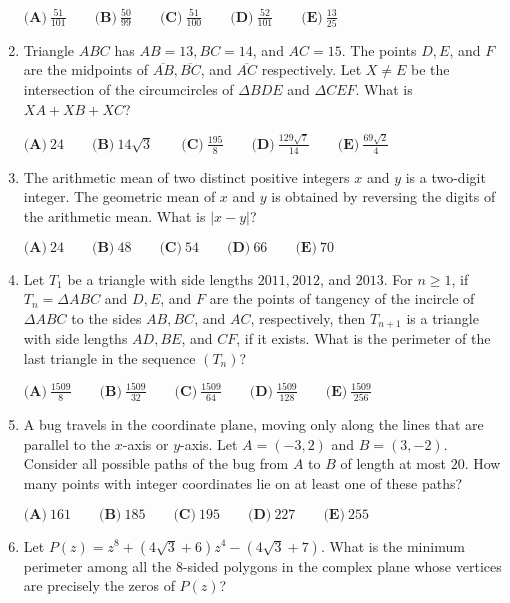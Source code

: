 \documentclass{article}
\begin{document}
\begin{enumerate}[label=\arabic*., itemsep=0.5em]
$\textbf{(A)}\ \frac{51}{101} \qquad \textbf{(B)}\ \frac{50}{99} \qquad \textbf{(C)}\ \frac{51}{100} \qquad \textbf{(D)}\ \frac{52}{101} \qquad \textbf{(E)}\ \frac{13}{25}$\par \vspace{0.5em}\item Triangle $ABC$ has $AB = 13, BC = 14$, and $AC = 15$. The points $D, E$, and $F$ are the midpoints of $\overline{AB}, \overline{BC}$, and $\overline{AC}$ respectively. Let $X \not= E$ be the intersection of the circumcircles of $\Delta BDE$ and $\Delta CEF$. What is $XA + XB + XC$?

$\textbf{(A)}\ 24 \qquad \textbf{(B)}\ 14\sqrt{3} \qquad \textbf{(C)}\ \frac{195}{8} \qquad \textbf{(D)}\ \frac{129\sqrt{7}}{14} \qquad \textbf{(E)}\ \frac{69\sqrt{2}}{4}$\par \vspace{0.5em}\item The arithmetic mean of two distinct positive integers $x$ and $y$ is a two-digit integer. The geometric mean of $x$ and $y$ is obtained by reversing the digits of the arithmetic mean. What is $|x - y|$?

$\textbf{(A)}\ 24 \qquad \textbf{(B)}\ 48 \qquad \textbf{(C)}\ 54 \qquad \textbf{(D)}\ 66 \qquad \textbf{(E)}\ 70$\par \vspace{0.5em}\item Let $T_1$ be a triangle with side lengths $2011, 2012$, and $2013$. For $n \geq 1$, if $T_n = \Delta ABC$ and $D, E$, and $F$ are the points of tangency of the incircle of $\Delta ABC$ to the sides $AB, BC$, and $AC$, respectively, then $T_{n+1}$ is a triangle with side lengths $AD, BE$, and $CF$, if it exists. What is the perimeter of the last triangle in the sequence $\left(T_n\right)$?

$\textbf{(A)}\ \frac{1509}{8} \qquad \textbf{(B)}\  \frac{1509}{32} \qquad \textbf{(C)}\  \frac{1509}{64} \qquad \textbf{(D)}\  \frac{1509}{128} \qquad \textbf{(E)}\  \frac{1509}{256}$\par \vspace{0.5em}\item A bug travels in the coordinate plane, moving only along the lines that are parallel to the $x$-axis or $y$-axis. Let $A = (-3, 2)$ and $B = (3, -2)$. Consider all possible paths of the bug from $A$ to $B$ of length at most $20$. How many points with integer coordinates lie on at least one of these paths?

$\textbf{(A)}\ 161 \qquad \textbf{(B)}\ 185 \qquad \textbf{(C)}\  195 \qquad \textbf{(D)}\  227 \qquad \textbf{(E)}\  255$\par \vspace{0.5em}\item Let $P(z) = z^8 + \left(4\sqrt{3} + 6\right)z^4 - \left(4\sqrt{3} + 7\right)$. What is the minimum perimeter among all the $8$-sided polygons in the complex plane whose vertices are precisely the zeros of $P(z)$?


\end{enumerate}
\end{document}
